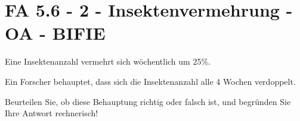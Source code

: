 \section{FA 5.6 - 2 - Insektenvermehrung  - OA - BIFIE}

\begin{beispiel}[FA 5.6]{1} %
Eine Insektenanzahl vermehrt sich wöchentlich um 25\%.

Ein Forscher behauptet, dass sich die Insektenanzahl alle 4 Wochen verdoppelt. 

Beurteilen Sie, ob diese Behauptung richtig oder falsch ist, und begründen Sie Ihre Antwort rechnerisch! 




\end{beispiel}